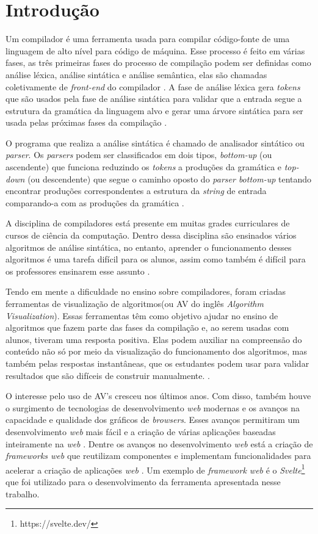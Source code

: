 \chapter{Introdução}
\label{cap:introducao}

Um compilador é uma ferramenta usada para compilar código-fonte de uma linguagem de alto nível para código de máquina. Esse processo é feito em várias fases, as três primeiras fases do processo de compilação podem ser definidas como análise léxica, análise sintática e análise semântica, elas são chamadas coletivamente de \textit{front-end} do compilador \cite{mogensen2024introduction}. A fase de análise léxica gera \textit{tokens} que são usados pela fase de análise sintática para validar que a entrada segue a estrutura da gramática da linguagem alvo e gerar uma árvore sintática para ser usada pelas próximas fases da compilação \cite{thain2020introduction}.

O programa que realiza a análise sintática é chamado de analisador sintático ou \textit{parser}. Os \textit{parsers} podem ser classificados em dois tipos, \textit{bottom-up} (ou ascendente) que funciona reduzindo os \textit{tokens} a produções da gramática e \textit{top-down} (ou descendente) que segue o caminho oposto do \textit{parser bottom-up} tentando encontrar produções correspondentes a estrutura da \textit{string} de entrada comparando-a com as produções da gramática \cite{cooper2022engineering}.

A disciplina de compiladores está presente em muitas grades curriculares de cursos de ciência da computação. Dentro dessa disciplina são ensinados vários algoritmos de análise sintática, no entanto, aprender o funcionamento desses algoritmos é uma tarefa difícil para os alunos, assim como também é difícil para os professores ensinarem esse assunto \cite{sangal2018pavt}.

Tendo em mente a dificuldade no ensino sobre compiladores, foram criadas ferramentas de visualização de algoritmos(ou AV do inglês \textit{Algorithm Visualization}). Essas ferramentas têm como objetivo ajudar no ensino de algoritmos que fazem parte das fases da compilação e, ao serem usadas com alunos, tiveram uma resposta positiva. Elas podem auxiliar na compreensão do conteúdo não só por meio da visualização do funcionamento dos algoritmos, mas também pelas respostas instantâneas, que os estudantes podem usar para validar resultados que são difíceis de construir manualmente. \cite{10.1145/3002136}.

O interesse pelo uso de AV's cresceu nos últimos anos. Com disso, também houve o surgimento de tecnologias de desenvolvimento \textit{web} modernas e os avanços na capacidade e qualidade dos gráficos de \textit{browsers}. Esses avanços permitiram um desenvolvimento \textit{web} mais fácil e a criação de várias aplicações baseadas inteiramente na \textit{web} \cite{effectiveav}. Dentre os avanços no desenvolvimento \textit{web} está a criação de \textit{frameworks web} que reutilizam componentes e implementam funcionalidades para acelerar a criação de aplicações \textit{web} \cite{uppal2022}. Um exemplo de \textit{framework web} é o \textit{Svelte}\footnote{https://svelte.dev/} que foi utilizado para o desenvolvimento da ferramenta apresentada nesse trabalho.

